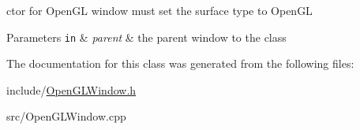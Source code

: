 ctor for Open\+G\+L window must set the surface type to Open\+G\+L 


\begin{DoxyParams}[1]{Parameters}
\mbox{\tt in}  & {\em parent} & the parent window to the class \\
\hline
\end{DoxyParams}


The documentation for this class was generated from the following files\+:\begin{DoxyCompactItemize}
\item 
include/\hyperlink{_open_g_l_window_8h}{Open\+G\+L\+Window.\+h}\item 
src/Open\+G\+L\+Window.\+cpp\end{DoxyCompactItemize}
